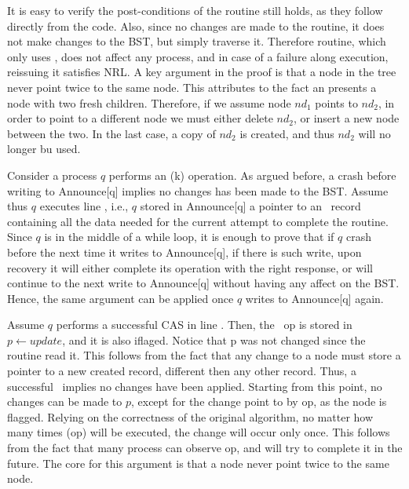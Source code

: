 It is easy to verify the post-conditions of the  routine still holds, as they follow directly from the code. Also, since no changes are made to the  routine, it does not make changes to the BST, but simply traverse it. Therefore  routine, which only uses , does not affect any process, and in case of a failure along  execution, reissuing it satisfies NRL. A key argument in the proof is that a node in the tree never point twice to the same node. This attributes to the fact an  presents a node with two fresh children. Therefore, if we assume node $nd_1$ points to $nd_2$, in order to point to a different node we must either delete $nd_2$, or insert a new node between the two. In the last case, a copy of $nd_2$ is created, and thus $nd_2$ will no longer bu used.

Consider a process $q$ performs an (k) operation. As argued before, a crash before writing to Announce[q] implies no changes has been made to the BST. Assume thus $q$ executes line , i.e., $q$ stored in Announce[q] a pointer to an \IFlag\ record containing all the data needed for the current attempt to complete the  routine. Since $q$ is in the middle of a while loop, it is enough to prove that if $q$ crash before the next time it writes to Announce[q], if there is such write, upon recovery it will either complete its operation with the right response, or will continue to the next write to Announce[q] without having any affect on the BST. Hence, the same argument can be applied once $q$ writes to Announce[q] again.

Assume $q$ performs a successful CAS in line . Then, the \IFlag\ op is stored in $p\leftarrow update$, and it is also iflaged. Notice that p was not changed since the  routine read it. This follows from the fact that any change to a node must store a pointer to a new created record, different then any other record. Thus, a successful \CASB\ implies no changes have been applied. Starting from this point, no changes can be made to $p$, except for the change point to by op, as the node is flagged. Relying on the correctness of the original algorithm, no matter how many times (op) will be executed, the change will occur only once. This follows from the fact that many process can observe op, and will try to complete it in the future. The core for this argument is that a node never point twice to the same node.








